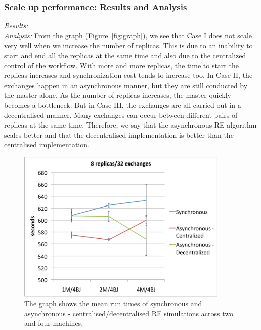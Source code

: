 \documentclass{rspublic}
\begin{document}
\subsubsection{Scale up performance: Results and Analysis}

{\it Results:}\\

{\it Analysis: } From the graph (Figure~\ref{fig:graph}), we see that
Case I does not scale very well when we increase the number of
replicas. This is due to an inability to start and end all the
replicas at the same time and also due to the centralized control of the workflow. With more and more replicas, the time to start the replicas increases  and 
synchronization cost tends to increase too.  In Case II, the exchanges happen in
an asynchronous manner, but they are still conducted by the master
alone. As the number of replicas increases, the master quickly becomes
a bottleneck. But in Case III, the exchanges are all carried out in a
decentralised manner. Many exchanges can occur between different pairs
of replicas at the same time. Therefore, we say that the asynchronous
RE algorithm scales better and that the decentralised implementation
is better than the centralised implementation.

%
\begin{figure}
\centering
\includegraphics[width=0.9\textwidth]{../data/8rep.pdf}
\caption{\small The graph shows the mean run times of synchronous and
  asynchronous - centralised/decentralised RE simulations across two
  and four machines.}
\label{fig:2machines}
\vspace{-1em}
\end{figure}
\end{document}
